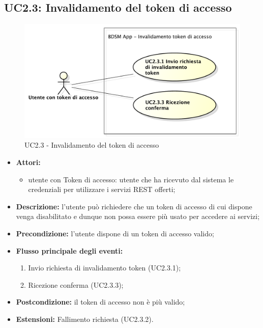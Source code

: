 \subsection{UC2.3: Invalidamento del token di accesso}
\begin{figure}[htbp]
	\centering
	\centerline{\includegraphics[scale=0.50]{./images/UC2_3.pdf}}
	\caption{UC2.3 - Invalidamento del token di accesso}
\end{figure}

\begin{itemize}
	\item \textbf{Attori:}
	\begin{itemize}
		\item utente con Token di accesso: utente che ha ricevuto dal sistema le credenziali per utilizzare i servizi REST offerti;
	\end{itemize}
	\item \textbf{Descrizione:} l'utente può richiedere che un token di accesso di cui dispone venga disabilitato e dunque non possa essere più usato per accedere ai servizi;
	\item \textbf{Precondizione:} l'utente dispone di un token di accesso valido;
	\item \textbf{Flusso principale degli eventi:}
	\begin{enumerate}
		\item Invio richiesta di invalidamento token (UC2.3.1);
		\item Ricezione conferma (UC2.3.3);
	\end{enumerate}
	\item \textbf{Postcondizione:} il token di accesso non è più valido;
	\item \textbf{Estensioni:} Fallimento richiesta (UC2.3.2).
\end{itemize}

